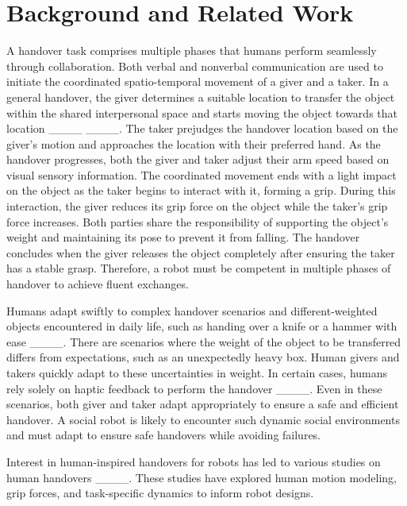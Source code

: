 \section{Background and Related Work}
A handover task comprises multiple phases that humans perform seamlessly through collaboration. Both verbal and nonverbal communication are used to initiate the coordinated spatio-temporal movement of a giver and a taker. In a general handover, the giver determines a suitable location to transfer the object within the shared interpersonal space and starts moving the object towards that location ____ ____. The taker prejudges the handover location based on the giver's motion and approaches the location with their preferred hand. As the handover progresses, both the giver and taker adjust their arm speed based on visual sensory information. The coordinated movement ends with a light impact on the object as the taker begins to interact with it, forming a grip. During this interaction, the giver reduces its grip force on the object while the taker's grip force increases. Both parties share the responsibility of supporting the object's weight and maintaining its pose to prevent it from falling. The handover concludes when the giver releases the object completely after ensuring the taker has a stable grasp. Therefore, a robot must be competent in multiple phases of handover to achieve fluent exchanges.

Humans adapt swiftly to complex handover scenarios and different-weighted objects encountered in daily life, such as handing over a knife or a hammer with ease ____. There are scenarios where the weight of the object to be transferred differs from expectations, such as an unexpectedly heavy box. Human givers and takers quickly adapt to these uncertainties in weight. In certain cases, humans rely solely on haptic feedback to perform the handover ____. Even in these scenarios, both giver and taker adapt appropriately to ensure a safe and efficient handover. A social robot is likely to encounter such dynamic social environments and must adapt to ensure safe handovers while avoiding failures.

Interest in human-inspired handovers for robots has led to various studies on human handovers ____. These studies have explored human motion modeling, grip forces, and task-specific dynamics to inform robot designs.
